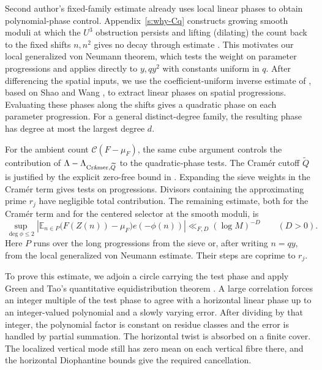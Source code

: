\documentclass[12pt]{amsart}
\newcommand{\1}{\mathbf 1}
\newcommand{\Cramer}{\textup{Cr\'amer}}
\theoremstyle{definition}
\begin{document}
Second author's fixed-family estimate
\cite[Theorem~4.1]{Teravainen} already uses local linear phases to
obtain polynomial-phase control. Appendix~\ref{s:why-Cq}
constructs growing smooth moduli at which the $U^3$ obstruction
persists and lifting (dilating) the count back to the fixed shifts $n,n^2$
gives no decay through estimate \cite[Theorem~4.1]{Teravainen}. This motivates
our local generalized von Neumann theorem, which tests the
weight on parameter progressions and applies directly to
$y,qy^2$ with constants uniform in $q$. After differencing the
spatial inputs, we use the coefficient-uniform inverse estimate
of \cite[Lemma~3.4]{KMTT}, based on Shao and Wang
\cite[Theorem~2.4]{ShaoWang}, to extract linear phases on spatial
progressions. Evaluating these phases along the shifts gives a
quadratic phase on each parameter progression. For a general
distinct-degree family, the resulting phase has degree at most
the largest degree $d$.

For the ambient count $\mathcal C(F-\mu_F)$, the same cube argument
controls the contribution of $\Lambda-\Lambda_{\Cramer,\widetilde Q}$
to the quadratic-phase tests. The Cram\'er cutoff $\widetilde Q$
is justified by the explicit zero-free bound in \cite{BanksSiegel}.
Expanding the sieve weights in the Cram\'er term gives tests on
progressions. Divisors containing the approximating prime $r_j$
have negligible total contribution. The remaining estimate, both
for the Cram\'er term and for the centered selector at the smooth
moduli, is
\[
 \sup_{\deg\phi\leq2}
 \left|\mathbb E_{n\in P}
     \bigl(F(Z(n))-\mu_F\bigr)e(-\phi(n))\right|
 \ll_{F,D}(\log M)^{-D}
 \qquad(D>0).
\]
Here $P$ runs over the long progressions from the sieve or,
after writing $n=qy$, from the local generalized von Neumann
estimate. Their steps are coprime to $r_j$.

To prove this estimate, we adjoin a circle carrying the test
phase and apply Green and Tao's quantitative equidistribution
theorem \cite{GreenTaoNil}. A large correlation forces an integer
multiple of the test phase to agree with a horizontal linear
phase up to an integer-valued polynomial and a slowly varying
error. After dividing by that integer, the polynomial factor
is constant on residue classes and the error is handled by
partial summation. The horizontal twist is absorbed on a finite
cover. The localized vertical mode still has zero mean on each
vertical fibre there, and the horizontal Diophantine bounds give
the required cancellation.
\end{document}
